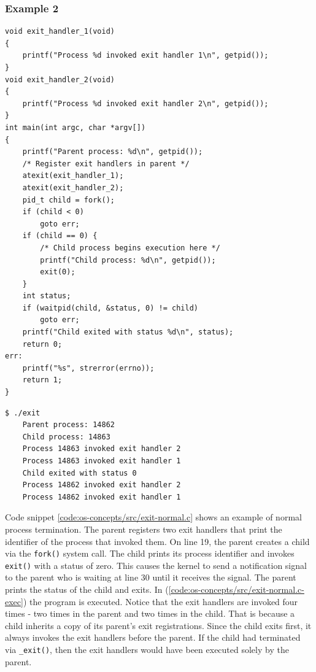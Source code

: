 \subsubsection{Example 2}
\begin{lstlisting}[label={code:os-concepts/src/exit-normal.c}, style=c-code-snippets, caption={os-concepts/src/exit-normal.c}]
void exit_handler_1(void)
{
    printf("Process %d invoked exit handler 1\n", getpid());
}
void exit_handler_2(void)
{
    printf("Process %d invoked exit handler 2\n", getpid());
}
int main(int argc, char *argv[])
{
    printf("Parent process: %d\n", getpid());
    /* Register exit handlers in parent */
    atexit(exit_handler_1);
    atexit(exit_handler_2);
    pid_t child = fork();
    if (child < 0)
        goto err;
    if (child == 0) {
        /* Child process begins execution here */
        printf("Child process: %d\n", getpid());
        exit(0);
    }
    int status;
    if (waitpid(child, &status, 0) != child)
        goto err;
    printf("Child exited with status %d\n", status);
    return 0;
err:
    printf("%s", strerror(errno));
    return 1;
}
\end{lstlisting}
\begin{lstlisting}[label={code:os-concepts/src/exit-normal.c-exec}, style=bash, caption={os-concepts/src/exit-normal.c output}]
    $ ./exit 
    Parent process: 14862
    Child process: 14863
    Process 14863 invoked exit handler 2
    Process 14863 invoked exit handler 1
    Child exited with status 0
    Process 14862 invoked exit handler 2
    Process 14862 invoked exit handler 1
\end{lstlisting}
Code snippet \ref{code:os-concepts/src/exit-normal.c} shows an example of normal process termination. 
The parent registers two exit handlers that print the identifier of 
the process that invoked them. On line 19, the parent creates a child via the \verb|fork()| system call.
The child prints its process identifier and invokes \verb|exit()| with a status of zero. This causes 
the kernel to send a notification signal to the parent who is waiting at line 30 until it receives 
the signal. The parent prints the status of the child and exits. In (\ref{code:os-concepts/src/exit-normal.c-exec}) the program 
is executed. Notice that the exit handlers are invoked four times - two times in the parent and two times 
in the child. That is because a child inherits a copy of its parent's exit registrations. 
Since the child exits first, it always invokes the exit handlers before the parent.
If the child had terminated via \verb|_exit()|, then the exit handlers would have been executed 
solely by the parent.

